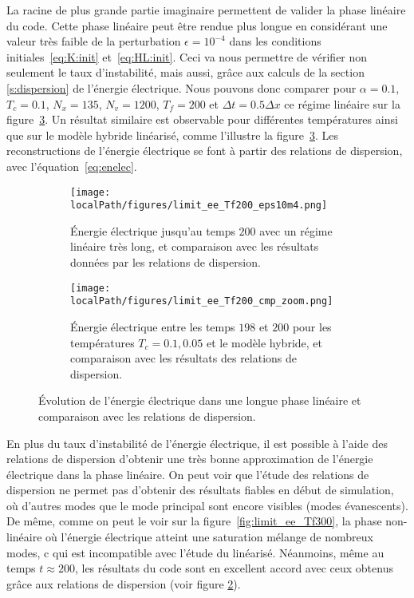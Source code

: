 La racine de plus grande partie imaginaire permettent de valider la phase linéaire du code. Cette phase linéaire peut être rendue plus longue en considérant une valeur très faible de la perturbation $\epsilon=10^{-4}$ dans les conditions initiales~\eqref{eq:K:init} et~\eqref{eq:HL:init}. Ceci va nous permettre de vérifier non seulement le taux d'instabilité, mais aussi, grâce aux calculs de la section \ref{s:dispersion} de l'énergie électrique. Nous pouvons donc comparer pour $\alpha = 0.1$, $T_c=0.1$, $N_x=135$, $N_v=1200$, $T_f=200$ et $\Delta t = 0.5\Delta x$ ce régime linéaire sur la figure~\ref{fig:limit:ee:Tf200}. Un résultat similaire est observable pour différentes températures ainsi que sur le modèle hybride linéarisé, comme l'illustre la figure~\ref{fig:limit:ee:Tf200}. Les reconstructions de l'énergie électrique se font à partir des relations de dispersion, avec l'équation~\eqref{eq:enelec}.
\begin{figure}
  \centering
  \begin{subfigure}{0.8\textwidth}
    \centering
    \texttt{[image: \\localPath/figures/limit\_ee\_Tf200\_eps10m4.png]}
    \caption{Énergie électrique jusqu'au temps $200$ avec un régime linéaire très long, et comparaison avec les résultats données par les relations de dispersion.}
    \label{fig:limit:ee:Tf200:eps10m4}
  \end{subfigure}
  \begin{subfigure}{0.8\textwidth}
    \centering
    \texttt{[image: \\localPath/figures/limit\_ee\_Tf200\_cmp\_zoom.png]}
    \caption{Énergie électrique entre les temps $198$ et $200$ pour les températures $T_c = 0.1,0.05$ et le modèle hybride, et comparaison avec les résultats des relations de dispersion.}
    \label{fig:limit:ee:Tf200:cmp_zoom}
  \end{subfigure}
  \caption{Évolution de l'énergie électrique dans une longue phase linéaire et comparaison avec les relations de dispersion.}
  \label{fig:limit:ee:Tf200}
\end{figure}
En plus du taux d'instabilité de l'énergie électrique, il est possible à l'aide des relations de dispersion d'obtenir une très bonne approximation de l'énergie électrique dans la phase linéaire. On peut voir que l'étude des relations de dispersion ne permet pas d'obtenir des résultats fiables en début de simulation, où d'autres modes que le mode principal sont encore visibles (modes évanescents). De même, comme on peut le voir sur la figure~\ref{fig:limit_ee_Tf300}, la phase non-linéaire où l'énergie électrique atteint une saturation mélange de nombreux modes, c qui est incompatible avec l'étude du linéarisé. Néanmoins, même au temps $t\approx 200$, les résultats du code sont en excellent accord avec ceux obtenus grâce aux relations de dispersion  (voir figure \ref{fig:limit:ee:Tf200:cmp_zoom}). 

